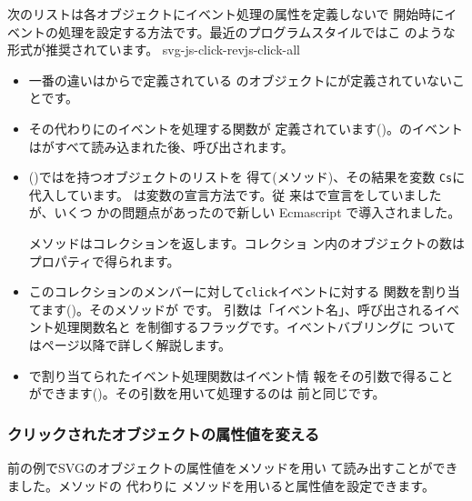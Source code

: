 次のリストは各オブジェクトにイベント処理の属性を定義しないで
開始時にイベントの処理を設定する方法です。最近のプログラムスタイルではこ
のような形式が推奨されています。
    {svg-js-click-rev}{js-click-all}
\begin{itemize}
 \item 一番の違いはからで定義されている
       のオブジェクトにが定義されていないことです。
 \item その代わりにのイベントを処理する関数が
 定義されています()。のイベントは\SVG がすべて読み込まれた後、呼び出されます。
  \item ()ではを持つオブジェクトのリストを
				得て(メソッド)、その結果を変数
				\texttt{Cs}に代入しています。 は変数の宣言方法です。従
				来はで宣言をしていましたが、いくつ
				かの問題点があったので新しい Ecmascript で導入されました。
   
   メソッドはコレクションを返します。コレクショ
				ン内のオブジェクトの数はプロパティで得られます。
 \item このコレクションのメンバーに対して\texttt{click}イベントに対する
 関数を割り当てます()。そのメソッドが
       です。
引数は「イベント名」、呼び出されるイベント処理関数名と
を制御するフラッグです。イベントバブリングに
       ついては\pageref{eventbubling}ページ以降で詳しく解説します。
 \item {}で割り当てられたイベント処理関数はイベント情
 報をその引数で得ることができます()。その引数を用いて処理するのは
 前と同じです。
\end{itemize}

\subsubsection{クリックされたオブジェクトの属性値を変える}
前の例でSVGのオブジェクトの属性値をメソッドを用い
て読み出すことができました。メソッドの
代わりに メソッドを用いると属性値を設定できます。

